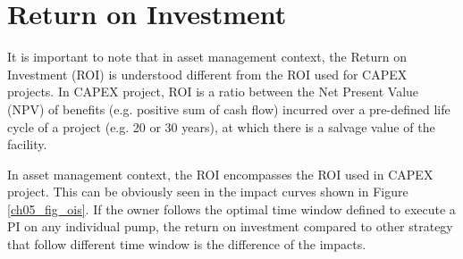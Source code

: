 \section{Return on Investment}
It is important to note that in asset management context, the Return on Investment (ROI) is understood different from the ROI used for CAPEX projects. In CAPEX project, ROI is a ratio between the Net Present Value (NPV) of benefits (e.g. positive sum of cash flow) incurred over a pre-defined life cycle of a project (e.g. 20 or 30 years), at which there is a salvage value of the facility.

In asset management context, the ROI encompasses the ROI used in CAPEX project. This can be obviously seen in the impact curves shown in Figure \ref{ch05_fig_ois}. If the owner follows the optimal time window defined to execute a PI on any individual pump, the return on investment compared to other strategy that follow different time window is the difference of the impacts.

